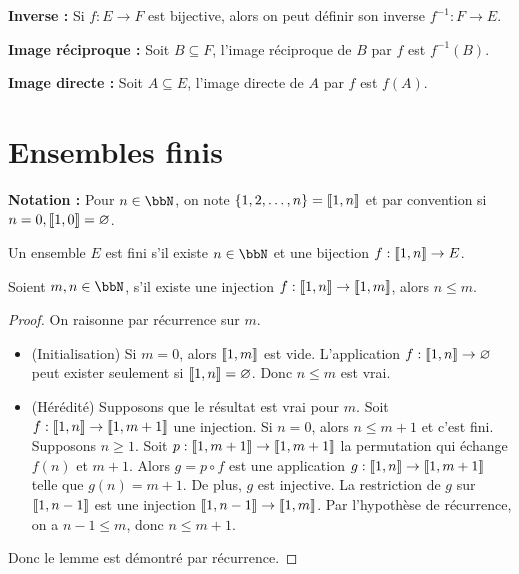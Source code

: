 \textbf{Inverse :} Si $f: E \to F$ est bijective, alors on peut définir son inverse $f^{-1}: F \to E$.

\textbf{Image réciproque :} Soit $B \subseteq F$, l'image réciproque de $B$ par $f$ est $f^{-1}(B)$.

\textbf{Image directe :} Soit $A \subseteq E$, l'image directe de $A$ par $f$ est $f(A)$.

\section{Ensembles finis}

\textbf{Notation :} Pour $n \in \bbN$, on note $\{1, 2, \ldots, n\} = \llbracket 1, n \rrbracket$ et
par convention si $n = 0, \llbracket 1, 0 \rrbracket = \varnothing$.

\begin{deff}
    Un ensemble $E$ est fini s'il existe $n \in \bbN$ et une bijection $f: \llbracket 1, n \rrbracket \to E$.
\end{deff}

\begin{lem}[fondamental]
    Soient $m, n \in \bbN$, s'il existe une injection $f: \llbracket 1, n \rrbracket \to \llbracket 1, m \rrbracket$, alors $n \leqslant m$.
\end{lem}

\begin{proof}
    On raisonne par récurrence sur $m$.
    \begin{itemize}
        \item (Initialisation)
              Si $m = 0$, alors $\llbracket 1, m \rrbracket$ est vide.
              L'application $f: \llbracket 1, n \rrbracket \to \varnothing$ peut exister seulement si
              $\llbracket 1, n \rrbracket = \varnothing$.
              Donc $n \leqslant m$ est vrai.
        \item (Hérédité)
              Supposons que le résultat est vrai pour $m$.
              Soit $f: \llbracket 1, n \rrbracket \to \llbracket 1, m + 1 \rrbracket$ une injection.
              Si $n = 0$, alors $n \leqslant m + 1$ et c'est fini.
              Supposons $n \geqslant 1$.
              Soit $p: \llbracket 1, m + 1 \rrbracket \to \llbracket 1, m + 1 \rrbracket$ la permutation qui échange $f(n)$ et $m + 1$.
              Alors $g = p \circ f$ est une application $g: \llbracket 1, n \rrbracket \to \llbracket 1, m + 1 \rrbracket$ telle que $g(n) = m + 1$.
              De plus, $g$ est injective.
              La restriction de $g$ sur $\llbracket 1, n - 1 \rrbracket$ est une injection $\llbracket 1, n - 1 \rrbracket \to \llbracket 1, m \rrbracket$.
              Par l'hypothèse de récurrence, on a $n - 1 \leqslant m$, donc $n \leqslant m + 1$.
    \end{itemize}

    Donc le lemme est démontré par récurrence. \qedhere
\end{proof}

